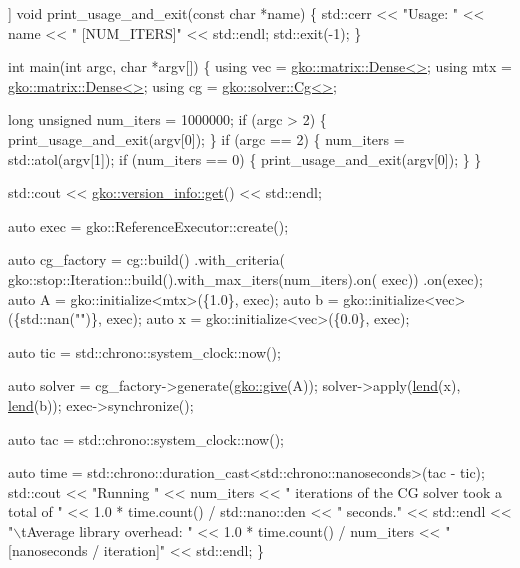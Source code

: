 \begin{DoxyCodeInclude}
[[noreturn]] \textcolor{keywordtype}{void} print\_usage\_and\_exit(\textcolor{keyword}{const} \textcolor{keywordtype}{char} *name)
\{
    std::cerr << \textcolor{stringliteral}{"Usage: "} << name << \textcolor{stringliteral}{" [NUM\_ITERS]"} << std::endl;
    std::exit(-1);
\}


\textcolor{keywordtype}{int} main(\textcolor{keywordtype}{int} argc, \textcolor{keywordtype}{char} *argv[])
\{
    \textcolor{keyword}{using} vec = \hyperlink{classgko_1_1matrix_1_1Dense}{gko::matrix::Dense<>};
    \textcolor{keyword}{using} mtx = \hyperlink{classgko_1_1matrix_1_1Dense}{gko::matrix::Dense<>};
    \textcolor{keyword}{using} cg = \hyperlink{classgko_1_1solver_1_1Cg}{gko::solver::Cg<>};

    \textcolor{keywordtype}{long} \textcolor{keywordtype}{unsigned} num\_iters = 1000000;
    \textcolor{keywordflow}{if} (argc > 2) \{
        print\_usage\_and\_exit(argv[0]);
    \}
    \textcolor{keywordflow}{if} (argc == 2) \{
        num\_iters = std::atol(argv[1]);
        \textcolor{keywordflow}{if} (num\_iters == 0) \{
            print\_usage\_and\_exit(argv[0]);
        \}
    \}

    std::cout << \hyperlink{classgko_1_1version__info_a6daeb8a087cfb57fa055526fc133d8eb}{gko::version\_info::get}() << std::endl;

    \textcolor{keyword}{auto} exec = gko::ReferenceExecutor::create();

    \textcolor{keyword}{auto} cg\_factory =
        cg::build()
            .with\_criteria(
                gko::stop::Iteration::build().with\_max\_iters(num\_iters).on(
                    exec))
            .on(exec);
    \textcolor{keyword}{auto} A = gko::initialize<mtx>(\{1.0\}, exec);
    \textcolor{keyword}{auto} b = gko::initialize<vec>(\{std::nan(\textcolor{stringliteral}{""})\}, exec);
    \textcolor{keyword}{auto} x = gko::initialize<vec>(\{0.0\}, exec);

    \textcolor{keyword}{auto} tic = std::chrono::system\_clock::now();

    \textcolor{keyword}{auto} solver = cg\_factory->generate(\hyperlink{namespacegko_acbd3fd6d07e498892881e8e2ab0b4167}{gko::give}(A));
    solver->apply(\hyperlink{namespacegko_aa8cb4876b72e5e1036ea9575443c439b}{lend}(x), \hyperlink{namespacegko_aa8cb4876b72e5e1036ea9575443c439b}{lend}(b));
    exec->synchronize();

    \textcolor{keyword}{auto} tac = std::chrono::system\_clock::now();

    \textcolor{keyword}{auto} time = std::chrono::duration\_cast<std::chrono::nanoseconds>(tac - tic);
    std::cout << \textcolor{stringliteral}{"Running "} << num\_iters
              << \textcolor{stringliteral}{" iterations of the CG solver took a total of "}
              << 1.0 * time.count() / std::nano::den << \textcolor{stringliteral}{" seconds."} << std::endl
              << \textcolor{stringliteral}{"\(\backslash\)tAverage library overhead:     "}
              << 1.0 * time.count() / num\_iters << \textcolor{stringliteral}{" [nanoseconds / iteration]"}
              << std::endl;
\}
\end{DoxyCodeInclude}
 